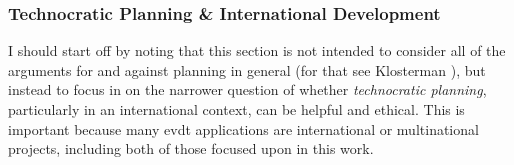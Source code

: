 





\subsubsection{Technocratic Planning \& International Development} \label{sec:technocracy}

I should start off by noting that this section is not intended to consider all of the arguments for and against planning in general (for that see Klosterman \cite{klostermanArgumentsPlanning1985}), but instead to focus in on the narrower question of whether \textit{technocratic planning}, particularly in an international context, can be helpful and ethical. This is important because many \ac{evdt} applications are international or multinational projects, including both of those focused upon in this work.

